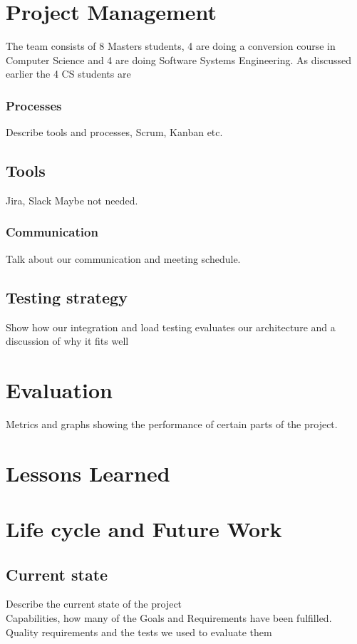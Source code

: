 \documentclass[prodmode,acmtecs]{acmsmall} %
\begin{document}

\section{Project Management}
The team consists of 8 Masters students, 4 are doing a conversion course in Computer Science and 4 are doing Software Systems Engineering. As discussed earlier the 4 CS students are
\subsubsection{Processes}
Describe tools and processes, Scrum, Kanban etc.


\subsection{Tools}
Jira, Slack Maybe not needed.

\subsubsection{Communication}
Talk about our communication and meeting schedule.


\subsection{Testing strategy}
Show how our integration and load testing evaluates our architecture and a discussion of why it fits well

\section{Evaluation}
Metrics and graphs showing the performance of certain parts of the project.


\section{Lessons Learned} %

\section{Life cycle and Future Work}
\subsection{Current state}
Describe the current state of the project\\
Capabilities, how many of the Goals and Requirements have been fulfilled.\\
Quality requirements and the tests we used to evaluate them\\
\end{document}
